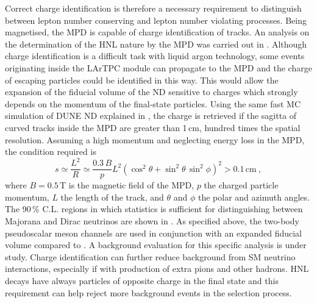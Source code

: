 Correct charge identification is therefore a necessary requirement to distinguish between %
lepton number conserving and lepton number violating processes.
Being magnetised, the MPD is capable of charge identification of tracks.
An analysis on the determination of the HNL nature by the MPD was carried out in .
Although charge identification is a difficult task with liquid argon technology, %
some events originating inside the LArTPC module can propagate to the MPD and the charge %
of escaping particles could be identified in this way.
This would allow the expansion of the fiducial volume of the ND sensitive to charges which strongly %
depends on the momentum of the final-state particles.
Using the same fast MC simulation of DUNE ND explained in , %
the charge is retrieved if the sagitta of curved tracks inside the MPD are greater than 1\,cm, %
hundred times the spatial resolution.
Assuming a high momentum and neglecting energy loss in the MPD, the condition required is 
\begin{equation}
	s \simeq \frac{L^2}{R} \simeq \frac{0.3\,B}{p} L^2 %
	(\cos^2\theta + \sin^2\theta\, \sin^2\phi)^2 > 0.1\,\text{cm}\ ,
\end{equation}
where $B = 0.5$\,T is the magnetic field of the MPD, $p$ the charged particle momentum, %
$L$ the length of the track, and $\theta$ and $\phi$ the polar and azimuth angles.
The 90\,\% C.L. regions in which statistics is sufficient for distinguishing between Majorana and Dirac neutrinos %
are shown in .
As specified above, the two-body pseudoscalar meson channels are used in conjunction with an expanded fiducial volume %
compared to .
A background evaluation for this specific analysis is under study.
Charge identification can further reduce background from SM neutrino interactions, %
especially if with production of extra pions and other hadrons.
HNL decays have always particles of opposite charge in the final state and this requirement %
can help reject more background events in the selection process.
\enlargethispage{\baselineskip}

